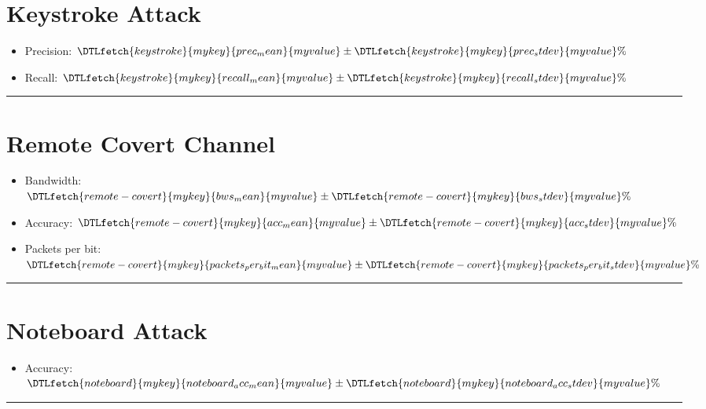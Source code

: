 \documentclass[letterpaper,twocolumn,10pt]{article}
\newcommand{\accessdatfile}[2]{\DTLfetch{#1}{mykey}{#2}{myvalue}}
\begin{document}
\begin{minipage}{\linewidth}
\section*{Keystroke Attack}
\begin{figure}[H]
\label{fig:keystroke_attack_results_time}
\end{figure}

\newcommand{\keystrokedata}[1]{\accessdatfile{keystroke}{#1}}
\begin{itemize}
    \item Precision: $\keystrokedata{prec_mean} \pm \keystrokedata{prec_stdev} \%$
    \item Recall: $\keystrokedata{recall_mean} \pm \keystrokedata{recall_stdev} \%$
\end{itemize}
\hrule
\end{minipage}

\begin{minipage}{\linewidth}
\section*{Remote Covert Channel}
\newcommand{\remotecovertdata}[1]{\accessdatfile{remote-covert}{#1}}
\begin{itemize}
    \item Bandwidth: $\remotecovertdata{bws_mean} \pm \remotecovertdata{bws_stdev} \% $
    \item Accuracy: $\remotecovertdata{acc_mean} \pm \remotecovertdata{acc_stdev} \% $
    \item Packets per bit: $\remotecovertdata{packets_per_bit_mean} \pm \remotecovertdata{packets_per_bit_stdev} \% $
\end{itemize}
\hrule
\end{minipage}


\begin{minipage}{\linewidth}
\section*{Noteboard Attack}
\newcommand{\noteboarddata}[1]{\accessdatfile{noteboard}{#1}}
\begin{itemize}
    \item Accuracy: $\noteboarddata{noteboard_acc_mean} \pm \noteboarddata{noteboard_acc_stdev} \% $
\end{itemize}
\hrule
\end{minipage}
\end{document}
